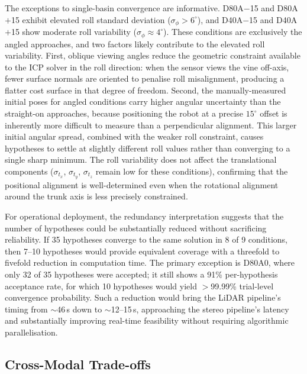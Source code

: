 The exceptions to single-basin convergence are informative. D80A$-$15 and D80A$+$15 exhibit elevated roll standard deviation ($\sigma_\phi > 6^{\circ}$), and D40A$-$15 and D40A$+$15 show moderate roll variability ($\sigma_\phi \approx 4^{\circ}$). These conditions are exclusively the angled approaches, and two factors likely contribute to the elevated roll variability. First, oblique viewing angles reduce the geometric constraint available to the ICP solver in the roll direction: when the sensor views the vine off-axis, fewer surface normals are oriented to penalise roll misalignment, producing a flatter cost surface in that degree of freedom. Second, the manually-measured initial poses for angled conditions carry higher angular uncertainty than the straight-on approaches, because positioning the robot at a precise $15^{\circ}$ offset is inherently more difficult to measure than a perpendicular alignment. This larger initial angular spread, combined with the weaker roll constraint, causes hypotheses to settle at slightly different roll values rather than converging to a single sharp minimum. The roll variability does not affect the translational components ($\sigma_{t_x}$, $\sigma_{t_y}$, $\sigma_{t_z}$ remain low for these conditions), confirming that the positional alignment is well-determined even when the rotational alignment around the trunk axis is less precisely constrained.

For operational deployment, the redundancy interpretation suggests that the number of hypotheses could be substantially reduced without sacrificing reliability. If 35 hypotheses converge to the same solution in 8 of 9 conditions, then 7--10 hypotheses would provide equivalent coverage with a threefold to fivefold reduction in computation time. The primary exception is D80A0, where only 32 of 35 hypotheses were accepted; it still shows a 91\% per-hypothesis acceptance rate, for which 10 hypotheses would yield $>$99.99\% trial-level convergence probability. Such a reduction would bring the LiDAR pipeline's timing from $\sim$46\,s down to $\sim$12--15\,s, approaching the stereo pipeline's latency and substantially improving real-time feasibility without requiring algorithmic parallelisation.

\subsection{Cross-Modal Trade-offs}
\label{subsec:pa-discussion-cross-modal}

